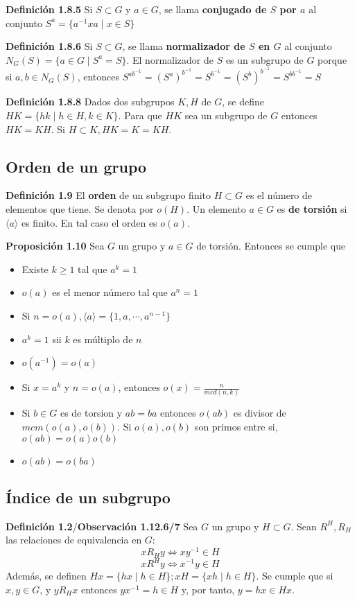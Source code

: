 \documentclass[a4paper, 11pt]{extarticle}
\newcommand{\propo}[1]{\textcolor{rojo}{\textbf{Proposición #1}}}
\newcommand{\defi}[1]{\textcolor{azul}{\textbf{Definición #1}}}
\newcommand{\obs}[1]{\textcolor{verde}{\textbf{Observación #1}}}
\begin{document}
\defi{1.8.5}  Si \(S \subset G\) y \(a \in G\), se llama \textbf{conjugado de \(S\) por \(a\)} al conjunto 
\(S^a = \{ a^{-1}xa \;|\; x \in S \}\)

\defi{1.8.6} Si \(S \subset G\), se llama \textbf{normalizador de \(S\) en \(G\)} al conjunto 
\(N_G(S) = \{ a \in G \;|\; S^a = S \}\).
El normalizador de \(S\) es un subgrupo de \(G\) porque si \(a,b \in N_G(S)\), entonces \(S^{ab^{-1}} = (S^a)^{b^{-1}} = S^{b^{-1}} = (S^b)^{b^{-1}} =
S^{bb^{-1}} = S\)

\defi{1.8.8} Dados dos subgrupos \(K,H\) de \(G\), se define 
\(HK = \{ hk \;|\; h \in H, k \in K \}\).
Para que \(HK\) sea un subgrupo de \(G\) entonces \(HK = KH\).
Si \(H \subset K, HK = K = KH\).

\subsection{Orden de un grupo}
\label{sec:org75b0572}
\defi{1.9} El \textbf{orden} de un subgrupo finito \(H \subset G\) es el número de elementos que tiene. Se denota por \(o(H)\). Un elemento \(a \in G\) es \textbf{de torsión} si \(\langle a \rangle\) es finito. En tal caso el orden
es \(o(a)\).

\propo{1.10} Sea \(G\) un grupo y \(a \in G\) de torsión. Entonces se cumple
que 
\begin{itemize}
\item Existe \(k \ge 1\) tal que \(a^k=1\)
\item \(o(a)\) es el menor número tal que \(a^n=1\)
\item Si \(n=o(a), \langle a \rangle = \{ 1, a, \cdots, a^{n-1} \}\)
\item \(a^k=1\) sii \(k\) es múltiplo de \(n\)
\item \(o(a^{-1}) = o(a)\)
\item Si \(x = a^k\) y \(n=o(a)\), entonces \(o(x) = \frac{n}{mcd(n,k)}\)
\item Si \(b \in G\) es de torsion y \(ab=ba\) entonces \(o(ab)\) es divisor de
\(mcm(o(a),o(b))\). Si \(o(a), o(b)\) son primos entre si, \(o(ab) =
  o(a)o(b)\)
\item \(o(ab) = o(ba)\)
\end{itemize}

\subsection{Índice de un subgrupo}
\label{sec:org4a0e5a8}
\defi{1.2}/\obs{1.12.6/7} Sea \(G\) un grupo y \(H \subset G\).  Sean \(R^H, R_H\) las relaciones de equivalencia en \(G\):
\[ xR_H y \iff xy^{-1} \in H \]
\[ xR^H y \iff x^{-1}y \in H \]
Además, se definen \(Hx = \{ hx \;|\; h \in H \}; xH = \{ xh \;|\; h \in H \}\).
Se cumple que si \(x,y \in G\), y \(yR_H x\) entonces \(yx^{-1} = h \in H\) y,
por tanto, \(y = hx \in Hx\).
\end{document}
